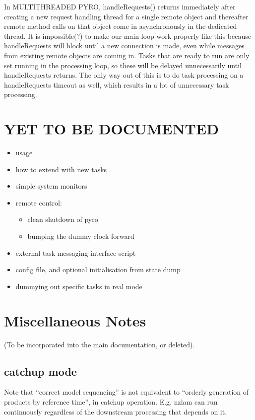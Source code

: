 \documentclass[12pt]{article}
\begin{document}
In MULTITHREADED PYRO, handleRequests() returns immediately after creating a
new request handling thread for a single remote object and thereafter remote
method calls on that object come in asynchronously in the dedicated thread.
It is impossible(?) to make our main loop work properly like this because
handleRequests will block until a new connection is made, even while messages
from existing remote objects are coming in.  Tasks that are ready to run are
only set running in the processing loop, so these will be delayed
unnecessarily until handleRequests returns.  The only way out of this is to do
task processing on a handleRequests timeout as well, which results in a lot of
unnecessary task processing.
 

\section{YET TO BE DOCUMENTED}

\begin{itemize}
 \item usage
 \item how to extend with new tasks
 \item simple system monitors
 \item remote control: 
    \begin{itemize}
    \item clean shutdown of pyro
    \item bumping the dummy clock forward
    \end{itemize}
 \item external task messaging interface script
 \item config file, and optional initialisation from state dump
 \item dummying out specific tasks in real mode
\end{itemize}


\section{Miscellaneous Notes}

(To be incorporated into the main documentation, or deleted).

\subsection{catchup mode}

Note that ``correct model sequencing'' is not equivalent to ``orderly
generation of products by reference time'', in catchup operation.  E.g.
nzlam can run continuously regardless of the downstream processing that
depends on it.
\end{document}
